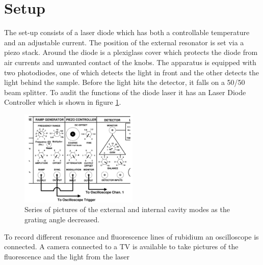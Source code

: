 \section{Setup}
\label{sec:setup}

The set-up consists of a laser diode which has both a controllable temperature and an adjustable current.
The position of the external resonator is set via a piezo stack.
Around the diode is a plexiglass cover which protects the diode from air currents and unwanted contact of the knobs.
The apparatus is equipped with two photodiodes, one of which detects the light in front and the other detects the light behind the sample.
Before the light hits the detector, it falls on a 50/50 beam splitter.
To audit the functions of the diode laser it has an Laser Diode Controller which is shown in figure \ref{fig:contr}.
\begin{figure}[H] 
    \centering
    \includegraphics[width=0.5\textwidth]{content/graphics/controller.jpg}
    \caption{Series of pictures of the external and internal cavity modes as the grating angle decreased.\cite{diode_laser}} %
    \label{fig:contr} 
\end{figure}
To record different resonance and fluorescence lines of rubidium an oscilloscope is connected. 
A camera connected to a TV is available to take pictures of the fluorescence and the light from the laser

